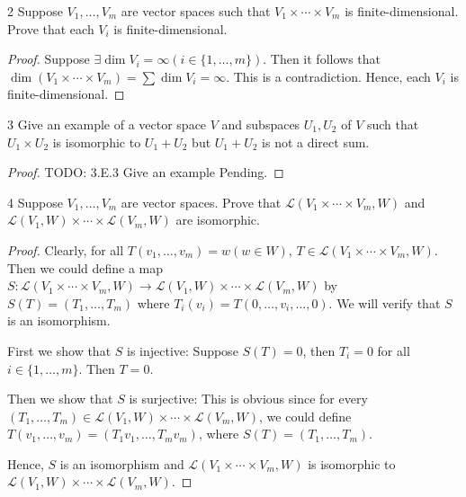 \documentclass{article}
\newenvironment{problem}[1]{\begin{prob*}{#1}{}}{\end{prob*}}
\begin{document}
\begin{problem}{2}
Suppose $V_1, \ldots , V_m$ are vector spaces such that $V_1 \times \cdots \times V_m$ is finite-dimensional. Prove that each $V_i$ is finite-dimensional.
\end{problem}
\begin{proof}
Suppose $\exists \operatorname{dim} V_i = \infty (i \in \{1, \ldots , m\})$. Then it follows that $\operatorname{dim} (V_1\times \cdots\times V_m) = \sum \operatorname{dim}V_i = \infty$. This is a contradiction. Hence, each $V_i$ is finite-dimensional.
\end{proof}

\begin{problem}{3}
Give an example of a vector space $V$ and subspaces $U_1, U_2$ of $V$ such that $U_1 \times U_2$ is isomorphic to $U_1 + U_2$ but $U_1 + U_2$ is not a direct sum.
\end{problem}
\begin{proof}
TODO: 3.E.3 Give an example Pending.
\end{proof}

\begin{problem}{4}
Suppose $V_1, \ldots , V_m$ are vector spaces. Prove that $\mathcal{L}(V_1 \times \cdots\times V_m, W)$ and $\mathcal{L}(V_1, W) \times \cdots \times \mathcal{L}(V_m, W)$ are isomorphic.
\end{problem}
\begin{proof}
Clearly, for all $T(v_1, \ldots ,v_m) = w (w\in W)$, $T \in \mathcal{L}(V_1 \times \cdots \times V_m, W)$. Then we could define a map $S: \mathcal{L}(V_1 \times \cdots \times V_m, W) \to \mathcal{L}(V_1, W) \times \cdots \times \mathcal{L}(V_m, W)$ by $S(T) = (T_1, \ldots ,T_m)$ where $T_i(v_i) = T(0, \ldots ,v_i , \ldots , 0)$. We will verify that $S$ is an isomorphism. \par
First we show that $S$ is injective: Suppose $S(T) = 0$, then $T_i = 0$ for all $i \in \{1, \ldots ,m\}$. Then $T = 0$. \par
Then we show that $S$ is surjective: This is obvious since for every $(T_1, \ldots , T_m) \in \mathcal{L}(V_1, W) \times \cdots \times \mathcal{L}(V_m, W)$, we could define $T(v_1, \ldots ,v_m) = (T_1v_1, \ldots ,T_mv_m)$, where $S(T) = (T_1, \ldots , T_m)$. \par
Hence, $S$ is an isomorphism and $\mathcal{L}(V_1 \times \cdots\times V_m, W)$ is isomorphic to $\mathcal{L}(V_1, W) \times \cdots\times \mathcal{L}(V_m, W)$.
\end{proof}
\end{document}
